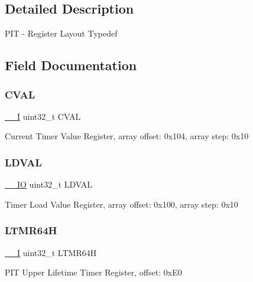 \subsection{Detailed Description}
P\+IT -\/ Register Layout Typedef 

\subsection{Field Documentation}
\mbox{\label{struct_p_i_t___type_ad4fcb6f0bd4cbbc890593eeb21152a92}} 
\subsubsection{\texorpdfstring{CVAL}{CVAL}}
{\footnotesize\ttfamily \mbox{\hyperlink{core__cm0plus_8h_af63697ed9952cc71e1225efe205f6cd3}{\+\_\+\+\_\+I}} uint32\+\_\+t C\+V\+AL}

Current Timer Value Register, array offset\+: 0x104, array step\+: 0x10 \mbox{\label{struct_p_i_t___type_a7066d020800ce5572217b4dd7be33245}} 
\subsubsection{\texorpdfstring{LDVAL}{LDVAL}}
{\footnotesize\ttfamily \mbox{\hyperlink{core__cm0plus_8h_aec43007d9998a0a0e01faede4133d6be}{\+\_\+\+\_\+\+IO}} uint32\+\_\+t L\+D\+V\+AL}

Timer Load Value Register, array offset\+: 0x100, array step\+: 0x10 \mbox{\label{struct_p_i_t___type_ae4123169fcefb48b1be09b131cbbbd51}} 
\subsubsection{\texorpdfstring{LTMR64H}{LTMR64H}}
{\footnotesize\ttfamily \mbox{\hyperlink{core__cm0plus_8h_af63697ed9952cc71e1225efe205f6cd3}{\+\_\+\+\_\+I}} uint32\+\_\+t L\+T\+M\+R64H}

P\+IT Upper Lifetime Timer Register, offset\+: 0x\+E0 \mbox{\label{struct_p_i_t___type_a350a7f2bc07234049109e960348ae22c}} 
